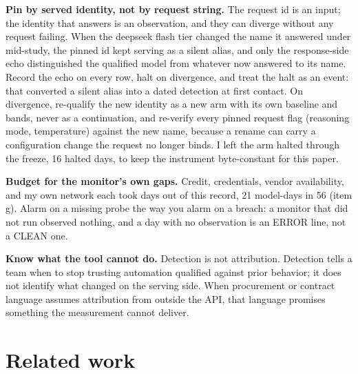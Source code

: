 \documentclass[conference]{IEEEtran}
\begin{document}
\textbf{Pin by served identity, not by request string.} The request id
is an input; the identity that answers is an observation, and they can
diverge without any request failing. When the deepseek flash tier changed the name it answered under mid-study, the pinned id kept serving as a
silent alias, and only the response-side echo distinguished the
qualified model from whatever now answered to its name. Record the
echo on every row, halt on divergence, and treat the halt as an event:
that converted a silent alias into a dated detection at first contact.
On divergence, re-qualify the new identity as a new arm with its own
baseline and bands, never as a continuation, and re-verify every
pinned request flag (reasoning mode, temperature) against the new
name, because a rename can carry a configuration change the request no
longer binds. I left the arm halted through the freeze, 16 halted
days, to keep the instrument byte-constant for this paper.

\textbf{Budget for the monitor's own gaps.} Credit, credentials,
vendor availability, and my own network each took days out of this
record, 21 model-days in 56 (item g). Alarm on a missing probe the way
you alarm on a breach: a monitor that did not run observed nothing,
and a day with no observation is an ERROR line, not a CLEAN one.

\textbf{Know what the tool cannot do.} Detection is not attribution.
Detection tells a team when to stop trusting automation qualified
against prior behavior; it does not identify what changed on the
serving side. When procurement or contract language assumes
attribution from outside the API, that language promises something the
measurement cannot deliver.

\section{Related work}
\end{document}
